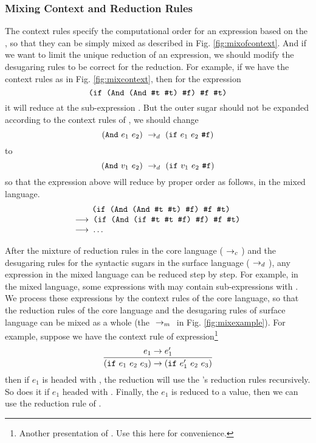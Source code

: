 \subsubsection{Mixing Context and Reduction Rules}

The context rules specify the computational order for an expression based on the , so that they can be simply mixed as described in Fig. \ref{fig:mixofcontext}. And if we want to limit the unique reduction of an expression, we should modify the desugaring rules to be correct for the reduction. For example, if we have the context rules as in Fig. \ref{fig:mixcontext}, then for the expression
\[
	\texttt{(if (And (And \#t~\#t) \#f) \#f~\#t)}
\]
it will reduce at the sub-expression . But the outer  sugar should not be expanded according to the context rules of , we should change
\[
	(\mbox{\tt And}~e_1~e_2) ~\rightarrow_d~ (\mbox{\tt if}~e_1~e_2~\mbox{\tt \#f})
\]
to
\[
	(\mbox{\tt And}~v_1~e_2) ~\rightarrow_d~ (\mbox{\tt if}~v_1~e_2~\mbox{\tt \#f})
\]
so that the expression above will reduce by proper order as follows, in the mixed language.
\[
	\begin{array}{l}
		\qquad\Code{(if (And (And \true~\true) \false) \false~\true)}\\
		\OneStep{ \Code{ (if (And (if \true~\true~\false) \false) \false~\true)}}\\
		\OneStep{ \Code{ $\ldots$}}
	\end{array}
\]

After the mixture of reduction rules in the core language ($~\rightarrow_c~$) and the  desugaring rules for the syntactic sugars in the surface language ($~\rightarrow_d~$), any expression in the mixed language can be reduced step by step. For example, in the mixed language, some expressions with  may contain sub-expressions with . We process these expressions by the context rules of the core language, so that the reduction rules of the core language and the desugaring rules of surface language can be mixed as a whole
 (the $~\rightarrow_m~$ in Fig. \ref{fig:mixexample}). For example, suppose we have the context rule of  expression\footnote{Another presentation of . Use this here for convenience.}
\[
\infer{(\m{if}~e_1~e_2~e_3) \rightarrow (\m{if}~e_1'~e_2~e_3)}{e_1 \rightarrow e_1'}
\]
then if $e_1$ is headed with , the reduction will use the 's reduction rules recursively. So does it if $e_1$ headed with . Finally, the $e_1$ is reduced to a value, then we can use the reduction rule of .
